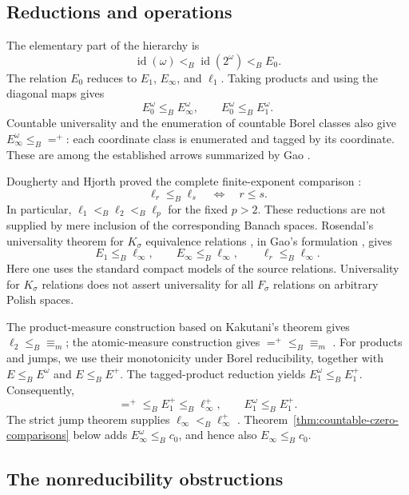 \documentclass[11pt]{article}
\numberwithin{equation}{section}
\theoremstyle{definition}
\begin{document}
\subsection{Reductions and operations}

The elementary part of the hierarchy is
\[
 \operatorname{id}(\omega)<_B\operatorname{id}(2^\omega)<_B E_0.
\]
The relation $E_0$ reduces to $E_1$, $E_\infty$, and $\ell_1$.
Taking products and using the diagonal maps gives
\[
 E_0^\omega\leq_B E_\infty^\omega,
 \qquad E_0^\omega\leq_B E_1^\omega.
\]
Countable universality and the enumeration of countable Borel classes
also give $E_\infty^\omega\leq_B{=^+}$: each coordinate class is
enumerated and tagged by its coordinate.  These are among the established
arrows summarized by Gao \cite[Figure~15.1]{Gao}.

Dougherty and Hjorth proved the complete finite-exponent comparison
\cite[Theorem~1.1]{DH}:
\begin{equation}\label{eq:dh-survey}
 \ell_r\leq_B\ell_s\quad\Longleftrightarrow\quad r\leq s.
\end{equation}
In particular, $\ell_1<_B\ell_2<_B\ell_p$ for the fixed $p>2$.
These reductions are not supplied by mere inclusion of the corresponding
Banach spaces.  Rosendal's universality theorem for $K_\sigma$
equivalence relations \cite{Rosendal}, in Gao's formulation
\cite[Theorem~8.4.2]{Gao}, gives
\[
 E_1\leq_B\ell_\infty,
 \qquad E_\infty\leq_B\ell_\infty,
 \qquad \ell_r\leq_B\ell_\infty.
\]
Here one uses the standard compact models of the source relations.
Universality for $K_\sigma$ relations does not assert universality for
all $F_\sigma$ relations on arbitrary Polish spaces.

The product-measure construction based on Kakutani's theorem \cite{Kakutani} gives
$\ell_2\leq_B{\equiv_m}$; the atomic-measure construction gives
${=^+}\leq_B{\equiv_m}$
\cite[Section~8.5]{Gao}.
For products and jumps, we use their monotonicity under Borel
reducibility, together with $E\leq_B E^\omega$ and $E\leq_B E^+$.
The tagged-product reduction
\cite[Exercise~15.2.1]{Gao} yields $E_1^\omega\leq_B E_1^+$.
Consequently,
\[
 {=^+}\leq_B E_1^+\leq_B\ell_\infty^+,
 \qquad E_1^\omega\leq_B E_1^+.
\]
The strict jump theorem supplies
$\ell_\infty<_B\ell_\infty^+$
\cite[Theorem~8.3.6]{Gao}.
Theorem~\ref{thm:countable-czero-comparisons} below adds
$E_\infty^\omega\leq_B c_0$, and hence also
$E_\infty\leq_B c_0$.

\subsection{The nonreducibility obstructions}
\end{document}
